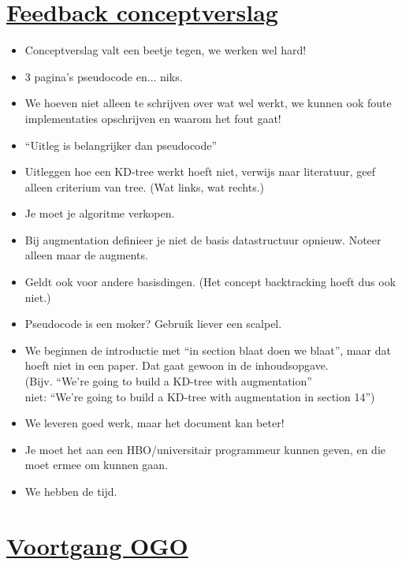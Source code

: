 \documentclass[a4paper]{article}
\begin{document}

\section{\underline{Feedback conceptverslag}} %
\label{sec:mededelingen}

\begin{itemize}
\item Conceptverslag valt een beetje tegen, we werken wel hard!
\item 3 pagina's pseudocode en... niks.
\item We hoeven niet alleen te schrijven over wat wel werkt, we kunnen ook foute implementaties opschrijven en waarom het fout gaat!
\item ``Uitleg is belangrijker dan pseudocode''
\item Uitleggen hoe een KD-tree werkt hoeft niet, verwijs naar literatuur, geef alleen criterium van tree. (Wat links, wat rechts.)
\item Je moet je algoritme verkopen.
\item Bij augmentation definieer je niet de basis datastructuur opnieuw. Noteer alleen maar de augments.
\item Geldt ook voor andere basisdingen. (Het concept backtracking hoeft dus ook niet.)
\item Pseudocode is een moker? Gebruik liever een scalpel.
\item We beginnen de introductie met ``in section blaat doen we blaat'', maar dat hoeft niet in een paper. Dat gaat gewoon in de inhoudsopgave.\\
  (Bijv. ``We're going to build a KD-tree with augmentation''\\
   niet: ``We're going to build a KD-tree with augmentation in section 14'')
\item We leveren goed werk, maar het document kan beter!
\item Je moet het aan een HBO/universitair programmeur kunnen geven, en die moet ermee om kunnen gaan.
\item We hebben de tijd.
\end{itemize}


\section{\underline{Voortgang OGO}} %
\label{sec:voortgang_ogo}
    
\end{document}
